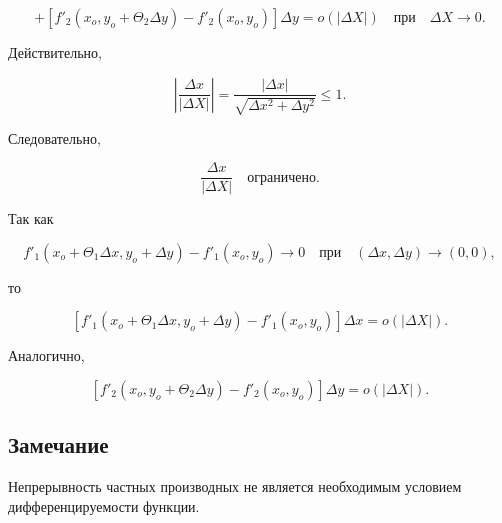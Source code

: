 {\[
+ [f'_2(x_o, y_o + \Theta_2 \Delta y) - f'_2(x_o, y_o)] \Delta y = o(|\Delta X|) \quad \text{при} \quad \Delta X \to 0.
\]



Действительно, 



\[
\left| \frac{\Delta x}{|\Delta X|} \right| = \frac{|\Delta x|}{\sqrt{\Delta x^2 + \Delta y^2}} \leq 1.
\]



Следовательно, 



\[
\frac{\Delta x}{|\Delta X|} \quad \text{ограничено}.
\]



Так как



\[
f'_1(x_o + \Theta_1 \Delta x, y_o + \Delta y) - f'_1(x_o, y_o) \to 0 \quad \text{при} \quad (\Delta x, \Delta y) \to (0, 0),
\]



то 



\[
[f'_1(x_o + \Theta_1 \Delta x, y_o + \Delta y) - f'_1(x_o, y_o)] \Delta x = o(|\Delta X|).
\]



Аналогично,



\[
[f'_2(x_o, y_o + \Theta_2 \Delta y) - f'_2(x_o, y_o)] \Delta y = o(|\Delta X|).
\]



\subsection*{Замечание}

Непрерывность частных производных не является необходимым условием дифференцируемости функции.





}
